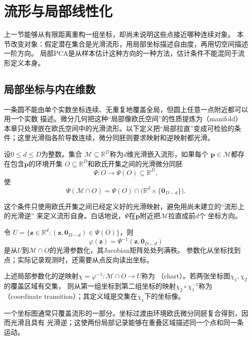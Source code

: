 \section{流形与局部线性化}
\label{sec:geometry-manifold-local-linearization}

上一节能够从有限距离重构一组坐标，却尚未说明这些点接近哪种连续对象。
本节改变对象：假定潜在集合是光滑流形，用局部坐标描述自由度，再用切空间描述一阶方向。
局部PCA是从样本估计这种方向的一种方法，估计条件不能混同于流形定义本身。

\subsection{局部坐标与内在维数}

一条圆不能由单个实数坐标连续、无重复地覆盖全局，但圆上任意一点附近都可以用一个实数
描述。微分几何把这种“局部像欧氏空间”的性质提炼为（manifold）
本章只处理嵌在欧氏空间中的光滑流形。以下定义把“局部拉直”变成可检验的条件；这里光滑指各阶导数连续，微分同胚则要求映射和逆映射都光滑。

\begin{definition}[光滑嵌入流形]
\label{def:geometry-embedded-manifold}
设$0\leq d\leq D$为整数。集合
$\mathcal{M}\subseteq\mathbb{R}^D$称为$d$维光滑嵌入流形，如果每个
$\bm{p}\in\mathcal{M}$都存在包含$\bm{p}$的环境开集
$O\subseteq\mathbb{R}^D$和欧氏开集之间的光滑微分同胚
\[
  \Psi:O\to\Psi(O)\subseteq\mathbb{R}^D,
\]
使
\[
  \Psi(\mathcal{M}\cap O)
  =
  \Psi(O)\cap
  \bigl(\mathbb{R}^d\times\{\bm{0}_{D-d}\}\bigr).
\]
\end{definition}
这个条件只使用欧氏开集之间已经定义好的光滑映射，避免用尚未建立的“流形上的光滑逆”
来定义流形自身。白话地说，$\Psi$在$\bm{p}$附近把$\mathcal{M}$拉直成前$d$个
坐标方向。

令
$U=\{\bm{z}\in\mathbb{R}^d:(\bm{z},\bm{0}_{D-d})\in\Psi(O)\}$，则
\[
  \varphi(\bm{z})
  =
  \Psi^{-1}(\bm{z},\bm{0}_{D-d})
\]
是从$U$到$\mathcal{M}\cap O$的光滑参数化，其Jacobian矩阵处处列满秩。
参数化从坐标找到点；实际记录观测时，还需要从点反向读出坐标。
\begin{definition}[局部坐标图与坐标过渡]
\label{def:geometry-chart-transition}
上述局部参数化的逆映射$\chi=\varphi^{-1}:\mathcal M\cap O\to U$称为
（chart）。若两张坐标图$\chi_1,\chi_2$的覆盖区域有交集，
则从第一组坐标到第二组坐标的映射$\chi_2\circ\chi_1^{-1}$称为
（coordinate transition）；其定义域是交集在$\chi_1$下的坐标像。
\end{definition}
一个坐标图通常只覆盖流形的一部分。坐标过渡由环境欧氏微分同胚复合得到，因而光滑且具有
光滑逆；这使两份局部记录能够在重叠区域描述同一个点和同一条运动。

